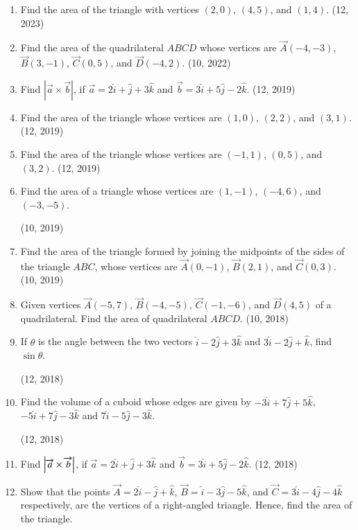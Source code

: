 \begin{enumerate}[label=\thesubsection.\arabic*, ref=\thesubsection.\theenumi]
    \item Find the area of the triangle with vertices $(2,  0)$,  $(4,  5)$,  and $(1,  4)$.
    \hfill (12,  2023)
    \item Find the area of the quadrilateral $ABCD$ whose vertices are $\vec{A}(-4,  -3)$,  $\vec{B}(3,  -1)$,  $\vec{C}(0,  5)$,  and $\vec{D}(-4,  2)$.
    \hfill (10,  2022)
	\item Find $|\overrightarrow{a} \times \overrightarrow{b}|$,  if $\overrightarrow{a} = 2\hat{i} + \hat{j} + 3\hat{k}$ and $\overrightarrow{b} = 3\hat{i} + 5\hat{j} - 2\hat{k}$. \hfill (12,  2019)
	\item Find the area of the triangle whose vertices are $(1,  0)$,  $(2,  2)$,  and $(3,  1)$. \hfill (12,  2019)
	\item Find the area of the triangle whose vertices are $(-1,  1)$,  $(0,  5)$,  and $(3,  2)$. \hfill (12,  2019)
\item Find the area of a triangle whose vertices are $(1,  -1)$,  $(-4,  6)$,  and $(-3,  -5)$.

	\hfill (10,  2019)
\item Find the area of the triangle formed by joining the midpoints of the sides of the triangle $ABC$,  whose vertices are $\vec{A}(0,  -1)$,  $\vec{B}(2,  1)$,  and $\vec{C}(0,  3)$. \hfill (10,  2019)
    \item Given vertices $\vec{A}(-5, 7)$,  $\vec{B}(-4, -5)$,  $\vec{C}(-1, -6)$,  and $\vec{D}(4, 5)$ of a quadrilateral. Find the area of quadrilateral $ABCD$. \hfill (10,  2018)
\item If $\theta$ is the angle between the two vectors $\hat{i} - 2\hat{j} + 3\hat{k}$ and $3\hat{i} - 2\hat{j} + \hat{k}$, find $\sin \theta$.

	\hfill (12,  2018)
\item Find the volume of a cuboid whose edges are given by $-3\hat{i}+7\hat{j}+5\hat{k}$, $-5\hat{i}+7\hat{j}-3\hat{k}$ and $7\hat{i}-5\hat{j}-3\hat{k}$.

\hfill (12,  2018) 
\item Find $\left\vert\overrightarrow{a} \times \overrightarrow{b}\right\vert$,  if $\overrightarrow{a}=2\hat{i}+\hat{j}+3\hat{k}$ and $\overrightarrow{b}=3\hat{i}+5\hat{j}-2\hat{k}$.
\hfill (12,  2018) 
    \item Show that the points $\vec{A} = 2\hat{i} - \hat{j} + \hat{k}$,  $\vec{B} = \hat{i} - 3\hat{j} - 5\hat{k}$,  and $\vec{C} = 3\hat{i} - 4\hat{j} - 4\hat{k}$ respectively,  are the vertices of a right-angled triangle. Hence, find the area of the triangle.


\end{enumerate}
